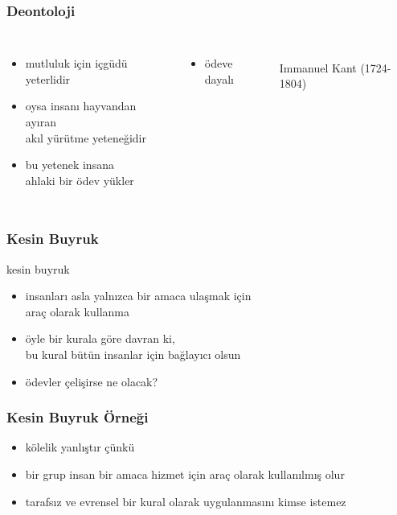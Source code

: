 \documentclass[dvipsnames]{beamer}
\theoremstyle{plain}
\begin{document}
\begin{frame}
  \frametitle{Deontoloji}

  \begin{columns}
    \begin{itemize}
      \item mutluluk için içgüdü yeterlidir
      \item oysa insanı hayvandan ayıran\\
        akıl yürütme yeteneğidir
      \item bu yetenek insana\\
        ahlaki bir ödev yükler
    \end{itemize}

    \begin{itemize}
      \item ödeve dayalı
    \end{itemize}

    \begin{center}
      \\
      Immanuel Kant (1724-1804)
    \end{center}
  \end{columns}
\end{frame}

\begin{frame}
  \frametitle{Kesin Buyruk}

  \begin{block}{kesin buyruk}
    \begin{itemize}
      \item insanları asla yalnızca bir amaca ulaşmak için\\
        araç olarak kullanma
      \item öyle bir kurala göre davran ki,\\
        bu kural bütün insanlar için bağlayıcı olsun
    \end{itemize}
  \end{block}

  \pause
  \begin{itemize}
    \item ödevler çelişirse ne olacak?
  \end{itemize}
\end{frame}

\begin{frame}
  \frametitle{Kesin Buyruk Örneği}

  \begin{itemize}
    \item kölelik yanlıştır çünkü

    \medskip
    \item bir grup insan bir amaca hizmet için araç olarak kullanılmış olur
    \item tarafsız ve evrensel bir kural olarak uygulanmasını kimse istemez
  \end{itemize}
\end{frame}
\end{document}
